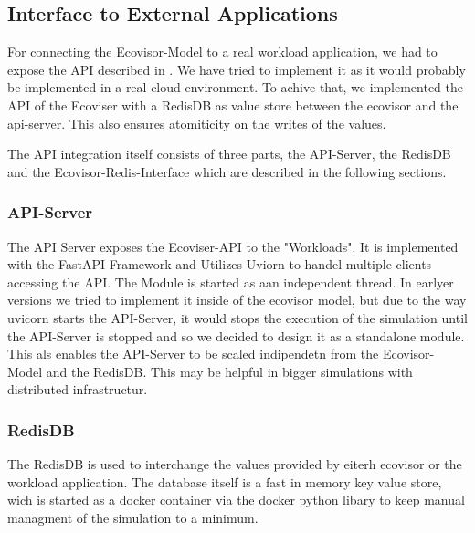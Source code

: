 \subsection{Interface to External Applications}

For connecting the Ecovisor-Model to a real workload application, we had to expose the API described in \cite{souza2023}. We have tried to implement it as it would probably be implemented in a real cloud environment. %
To achive that, we implemented the API of the Ecoviser with a RedisDB as value store between the ecovisor and the api-server. This also ensures atomiticity on the writes of the values. %

The API integration itself consists of three parts, the API-Server, the RedisDB and the Ecovisor-Redis-Interface which are described in the following sections.



\subsubsection{API-Server}
The API Server exposes the Ecoviser-API to the "Workloads". It is implemented with the FastAPI Framework and Utilizes Uviorn to handel multiple clients accessing the API.
The Module is started as aan independent thread. In earlyer versions we tried to implement it inside of the ecovisor model, but due to the way uvicorn starts the API-Server,
it would stops the execution of the simulation until the API-Server is stopped and so we decided to design it as a standalone module. This als enables the API-Server to be scaled indipendetn from
the Ecovisor-Model and the RedisDB. This may be helpful in bigger simulations with distributed infrastructur. 


\subsubsection{RedisDB}
The RedisDB is used to interchange the values provided by eiterh ecovisor or the workload application. The database itself is a fast in memory key value store, wich is started as a docker container via the docker python libary %
to keep manual managment of the simulation to a minimum.

